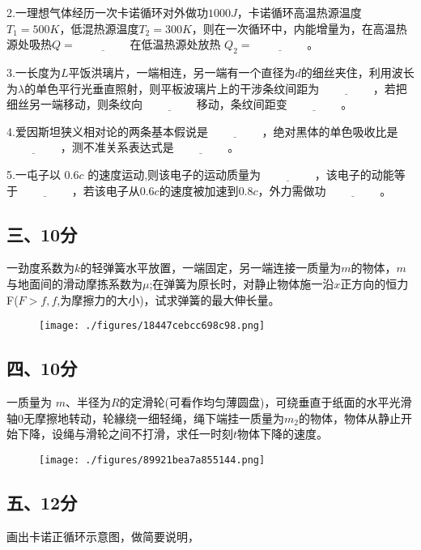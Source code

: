 2.一理想气体经历一次卡诺循环对外做功$1000J$，卡诺循环高温热源温度$T_1=500K$，低混热源温度$T_2=300K$，则在一次循环中，内能增量为，在高温热源处吸热$Q=\underline{\hspace{2cm}}$在低温热源处放热 $Q_2=\underline{\hspace{2cm}}$。

3.一长度为$L$平饭洪璃片，一端相连，另一端有一个直径为$d$的细丝夹住，利用波长为$\lambda$的单色平行光垂直照射，则平板波璃片上的干涉条纹间距为$\underline{\hspace{2cm}}$，若把细丝另一端移动，则条纹向$\underline{\hspace{2cm}}$移动，条纹间距变$\underline{\hspace{2cm}}$。

4.爱因斯坦狭义相对论的两条基本假说是$\underline{\hspace{2cm}}$，绝对黑体的单色吸收比是$\underline{\hspace{2cm}}$，测不准关系表达式是$\underline{\hspace{2cm}}$。

5.一屯子以 $0.6c$ 的速度运动,则该电子的运动质量为$\underline{\hspace{2cm}}$，该电子的动能等于$\underline{\hspace{2cm}}$，若该电子从$0.6c$的速度被加速到$0.8c$，外力需做功$\underline{\hspace{2cm}}$。
\subsection{三、10分}
一劲度系数为$k$的轻弹簧水平放置，一端固定，另一端连接一质量为$m$的物体，$m$ 与地面间的滑动摩拣系数为$\mu$;在弹簧为原长时，对静止物体施一沿$x$正方向的恒力F($F>f,f$,为摩擦力的大小)，试求弹簧的最大伸长量。
\begin{figure}[ht]
\centering
\texttt{[image: ./figures/18447cebcc698c98.png]}
\caption{} \label{fig_NJU_2}
\end{figure}
\subsection{四、10分}
一质量为 $m$、半径为$R$的定滑轮(可看作均匀薄圆盘)，可绕垂直于纸面的水平光滑轴0无摩擦地转动，轮緣绕一细轻绳，绳下端挂一质量为$m_2$的物体，物体从静止开始下降，设绳与滑轮之间不打滑，求任一时刻$t$物体下降的速度。
\begin{figure}[ht]
\centering
\texttt{[image: ./figures/89921bea7a855144.png]}
\caption{} \label{fig_NJU_3}
\end{figure}
\subsection{五、12分}
画出卡诺正循环示意图，做简要说明，